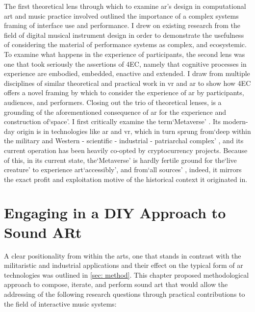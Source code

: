 The first theoretical lens through which to examine \gls{ar}'s design in computational art and music practice involved outlined the importance of a complex systems framing of interface use and performance. I drew on existing research from the field of digital musical instrument design \citep{magnusson2009a,discipio2003,essl2006,armstrong2006,hayes2019,chevalier2018} in order to demonstrate the usefulness of considering the material of performance systems as complex, and ecosystemic. To examine what happens in the experience of participants, the second lens was one that took seriously the assertions of 4EC, namely that cognitive processes in experience are embodied, embedded, enactive and extended. I draw from multiple disciplines of similar theoretical and practical work in \gls{vr} and \gls{ar} to show how 4EC offers a novel framing by which to consider the experience of \gls{ar} by participants, audiences, and performers. Closing out the trio of theoretical lenses, is a grounding of the aforementioned consequence of \gls{ar} for the experience and construction of`space'. I first critically examine the term`Metaverse' \citep{stephenson1992}. Its modern-day origin is in technologies like \gls{ar} and \gls{vr}, which in turn sprung from`deep within the military and Western - scientific - industrial - patriarchal complex' \citep{davies2004}, and its current operation has been heavily co-opted by cryptocurrency projects. Because of this, in its current state, the`Metaverse' is hardly fertile ground for the`live creature' to experience art`accessibly', and from`all sources' \citep{dewey1934,leddy2021}, indeed, it mirrors the exact profit and exploitation motive of the historical context it originated in.



\section{Engaging in a DIY Approach to Sound ARt}\label{sec: discussion-method}
A clear positionality from within the arts, one that stands in contrast with the militaristic and industrial applications and their effect on the typical form of \gls{ar} technologies was outlined in \autoref{sec: method}. This chapter proposed methodological approach to compose, iterate, and perform sound \gls{art} that would allow the addressing of the following research questions through practical contributions to the field of interactive music systems: 

